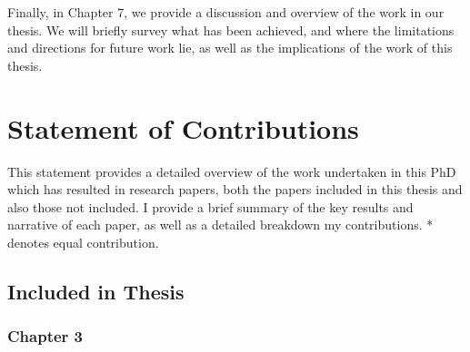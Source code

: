 Finally, in Chapter 7, we provide a discussion and overview of the work in our thesis. We will briefly survey what has been achieved, and where the limitations and directions for future work lie, as well as the implications of the work of this thesis. 

\section{Statement of Contributions}

This statement provides a detailed overview of the work undertaken in this PhD which has resulted in research papers, both the papers included in this thesis and also those not included. I provide a brief summary of the key results and narrative of each paper, as well as a detailed breakdown my contributions. * denotes equal contribution.


\subsection{Included in Thesis}






\subsubsection{Chapter 3}

